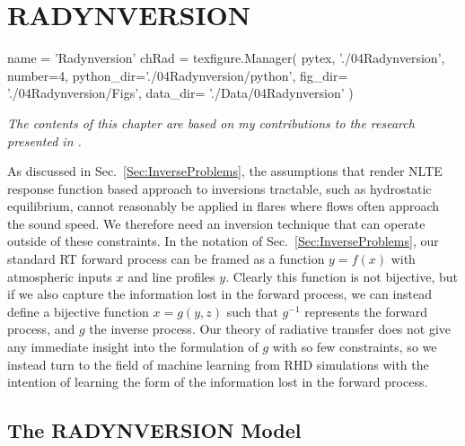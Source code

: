\chapter{RADYNVERSION}\label{Chap:Radynversion}
\begin{pycode}[Radynversion]
name = 'Radynversion'
chRad = texfigure.Manager(
    pytex,
    './04Radynversion',
    number=4,
    python_dir='./04Radynversion/python',
    fig_dir=   './04Radynversion/Figs',
    data_dir=  './Data/04Radynversion'
)
\end{pycode}


\emph{The contents of this chapter are based on my contributions to the research presented in \citet{Osborne2019}.}

As discussed in Sec.~\ref{Sec:InverseProblems}, the assumptions that render NLTE response function based approach to inversions tractable, such as hydrostatic equilibrium, cannot reasonably be applied in flares where flows often approach the sound speed.
We therefore need an inversion technique that can operate outside of these constraints.
In the notation of Sec.~\ref{Sec:InverseProblems}, our standard RT forward process can be framed as a function $y = f(x)$ with atmospheric inputs $x$ and line profiles $y$.
Clearly this function is not bijective, but if we also capture the information lost in the forward process, we can instead define a bijective function $x = g(y, z)$ such that $g^{-1}$ represents the forward process, and $g$ the inverse process.
Our theory of radiative transfer does not give any immediate insight into the formulation of $g$ with so few constraints, so we instead turn to the field of machine learning from RHD simulations with the intention of learning the form of the information lost in the forward process.

\section{The RADYNVERSION Model}\label{Sec:RadynversionModel}

